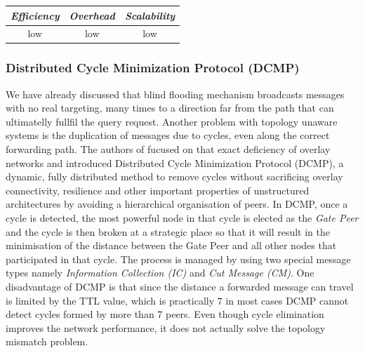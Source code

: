\begin{center}
\begin{tabular}{ccc}
\emph{Efficiency} & \emph{Overhead} & \emph{Scalability} \\
\hline
low &
low &
low
\end{tabular}
\end{center}

\subsubsection{Distributed Cycle Minimization Protocol (DCMP)}
We have already discussed that blind flooding mechanism broadcasts messages with
no real targeting, many times to a direction far from the path that can
ultimatelly fullfil the query request. Another problem with topology unaware
systems is the duplication of messages due to cycles, even along the correct
forwarding path. The authors of \cite{zhu_dcmp_2008} fucused on that exact
deficiency of overlay networks and introduced Distributed Cycle Minimization
Protocol (DCMP), a dynamic, fully distributed method to remove cycles without
sacrificing overlay connectivity, resilience and other important properties of
unstructured architectures by avoiding a hierarchical organisation of peers. In
DCMP, once a cycle is detected, the most powerful node in that cycle is
elected as the \emph{Gate Peer} and the cycle is then broken at a strategic
place so that it will result in the minimisation of the distance between the
Gate Peer and all other nodes that participated in that cycle. The process
is managed by using two special message types namely \emph{Information
Collection (IC)} and \emph{Cut Message (CM)}. One disadvantage of DCMP is that
since the distance a forwarded message can travel is limited by the TTL value,
which is practically $7$ in most cases DCMP cannot detect cycles formed by more
than 7 peers. Even though cycle elimination improves the network performance, it
does not actually solve the topology mismatch problem.

